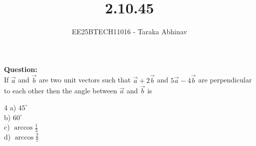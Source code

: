 \documentclass[journal]{IEEEtran}
\begin{document}
	
	
	\vspace{3cm}
	
	\title{2.10.45}
	\author{EE25BTECH11016 - Taraka Abhinav}
	\maketitle
	{\let\newpage\relax\maketitle}
	
	\setlength{\intextsep}{10pt} %

\textbf{Question:}\\
If $\vec{a}$ and $\vec{b}$ are two unit vectors such that $\vec{a} + 2\vec{b}$ and $5\vec{a} - 4\vec{b}$ are perpendicular to each other then the angle between $\vec{a}$ and $\vec{b}$ is
\begin{multicols}{4}
\noindent a) $45^\circ$\\
b) $60^\circ$\\
c) $\arccos \frac{1}{3}$\\
d) $\arccos \frac{2}{7}$
\end{multicols}
\end{document}

